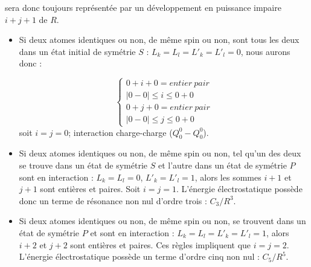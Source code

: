 	sera donc toujours représentée par un développement en puissance impaire $i+ j + 1$ de $R$.
	
	\begin{itemize}
		\item Si deux atomes identiques ou non, de même spin ou non, sont tous les deux dans un état initial de symétrie $S$ : $L_{k} = L_{l} = L'_{k} = L'_{l} = 0$, nous aurons donc : 
		
		\begin{equation*}
		\begin{cases}
		0 + i + 0 = entier\ pair \\
		|0 - 0| \leq i \leq 0 + 0 \\
		0 + j + 0 = entier\ pair \\
		|0 - 0| \leq j \leq 0 + 0
		\end{cases}
		\end{equation*}
		soit $i = j = 0$; interaction charge-charge ($Q_{0}^{0}- Q_{0}^{0}$). 
		
		\item Si deux atomes identiques ou non, de même spin ou non, tel qu'un des deux se trouve dans un état de symétrie $S$ et l'autre dans un état de symétrie $P$ sont en interaction : $L_{k} = L_{l} = 0$, $L'_{k} = L'_{l} = 1$, alors les sommes $i + 1$ et $j + 1$ sont entières et paires. Soit $i = j = 1$. L'énergie électrostatique possède donc un terme de résonance non nul d'ordre trois : $C_{3}/R^{3}$. 
		
		\item Si deux atomes identiques ou non, de même spin ou non, se trouvent dans un état de symétrie $P$ et sont en interaction : $L_{k} = L_{l} = L'_{k} = L'_{l} = 1$, alors $i + 2$ et $j + 2$ sont entières et paires. Ces règles impliquent que $i = j = 2$. L'énergie électrostatique possède un terme d'ordre cinq non nul : $C_{5}/R^{5}$. 
		
	\end{itemize}
	
	
	
	
	
